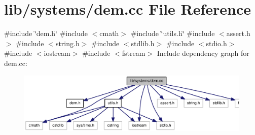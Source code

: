 \section{lib/systems/dem.cc \-File \-Reference}
\label{dem_8cc}
{\ttfamily \#include \char`\"{}dem.\-h\char`\"{}}\*
{\ttfamily \#include $<$cmath$>$}\*
{\ttfamily \#include \char`\"{}utils.\-h\char`\"{}}\*
{\ttfamily \#include $<$assert.\-h$>$}\*
{\ttfamily \#include $<$string.\-h$>$}\*
{\ttfamily \#include $<$stdlib.\-h$>$}\*
{\ttfamily \#include $<$stdio.\-h$>$}\*
{\ttfamily \#include $<$iostream$>$}\*
{\ttfamily \#include $<$fstream$>$}\*
\-Include dependency graph for dem.\-cc\-:
\nopagebreak
\begin{figure}[H]
\begin{center}
\leavevmode
\includegraphics[width=350pt]{dem_8cc__incl}
\end{center}
\end{figure}

